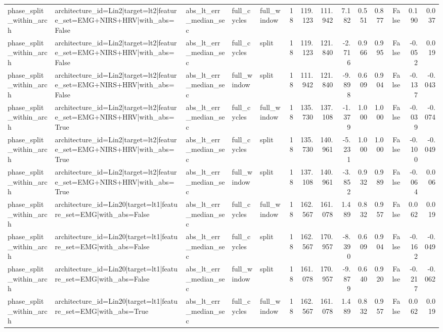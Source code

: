 \begin{table}
\begin{tabular}{lllllrrrrrrrrr}
phase_split_within_arch & architecture_id=Lin2|target=lt2|feature_set=EMG+NIRS+HRV|with_abs=False & abs_lt_err_median_sec & full_cycles & full_window & 18 & 119.123 & 111.942 & 7.182 & 0.551 & 0.877 & False & 0.190 & 0.037 \\
phase_split_within_arch & architecture_id=Lin2|target=lt2|feature_set=EMG+NIRS+HRV|with_abs=False & abs_lt_err_median_sec & full_cycles & split & 18 & 119.123 & 121.840 & -2.716 & 0.966 & 0.995 & False & -0.052 & 0.019 \\
phase_split_within_arch & architecture_id=Lin2|target=lt2|feature_set=EMG+NIRS+HRV|with_abs=False & abs_lt_err_median_sec & full_window & split & 18 & 111.942 & 121.840 & -9.898 & 0.609 & 0.904 & False & -0.137 & -0.043 \\
phase_split_within_arch & architecture_id=Lin2|target=lt2|feature_set=EMG+NIRS+HRV|with_abs=True & abs_lt_err_median_sec & full_cycles & full_window & 18 & 135.730 & 137.108 & -1.379 & 1.000 & 1.000 & False & -0.039 & -0.074 \\
phase_split_within_arch & architecture_id=Lin2|target=lt2|feature_set=EMG+NIRS+HRV|with_abs=True & abs_lt_err_median_sec & full_cycles & split & 18 & 135.730 & 140.961 & -5.231 & 1.000 & 1.000 & False & -0.100 & -0.049 \\
phase_split_within_arch & architecture_id=Lin2|target=lt2|feature_set=EMG+NIRS+HRV|with_abs=True & abs_lt_err_median_sec & full_window & split & 18 & 137.108 & 140.961 & -3.852 & 0.932 & 0.989 & False & -0.064 & 0.006 \\
phase_split_within_arch & architecture_id=Lin20|target=lt1|feature_set=EMG|with_abs=False & abs_lt_err_median_sec & full_cycles & full_window & 18 & 162.567 & 161.078 & 1.489 & 0.832 & 0.957 & False & 0.062 & 0.019 \\
phase_split_within_arch & architecture_id=Lin20|target=lt1|feature_set=EMG|with_abs=False & abs_lt_err_median_sec & full_cycles & split & 18 & 162.567 & 170.957 & -8.390 & 0.609 & 0.904 & False & -0.162 & -0.049 \\
phase_split_within_arch & architecture_id=Lin20|target=lt1|feature_set=EMG|with_abs=False & abs_lt_err_median_sec & full_window & split & 18 & 161.078 & 170.957 & -9.879 & 0.640 & 0.920 & False & -0.217 & -0.062 \\
phase_split_within_arch & architecture_id=Lin20|target=lt1|feature_set=EMG|with_abs=True & abs_lt_err_median_sec & full_cycles & full_window & 18 & 162.567 & 161.078 & 1.489 & 0.832 & 0.957 & False & 0.062 & 0.019 \\

\end{tabular}
\end{table}
